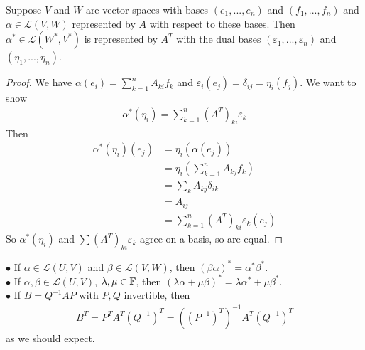 \documentclass[a4paper]{article}
\begin{document}
\begin{prop}
Suppose $V$ and $W$ are vector spaces with bases $\left(e_1,...,e_n\right)$ and $\left(f_1,...,f_n\right)$ and $\alpha \in \mathcal{L}\left(V,W\right)$ represented by $A$ with respect to these bases. Then $\alpha^* \in \mathcal{L} \left(W^*,V^*\right)$ is represented by $A^T$ with the dual bases $\left(\varepsilon_1,...,\varepsilon_n\right)$ and $\left(\eta_1,...,\eta_n\right)$.
\begin{proof}
We have $\alpha\left(e_i\right) = \sum_{k=1}^n A_{ki} f_k$ and $\varepsilon_i\left(e_j\right) = \delta_{ij} = \eta_i \left(f_j\right)$. We want to show
\begin{equation*}
\begin{aligned}
\alpha^*\left(\eta_i\right) = \sum_{k=1}^n \left(A^T\right)_{ki} \varepsilon_k
\end{aligned}
\end{equation*}
Then
\begin{equation*}
\begin{aligned}
\alpha^*\left(\eta_i\right)\left(e_j\right) &= \eta_i \left(\alpha\left(e_j\right)\right)\\
&= \eta_i\left(\sum_{k=1}^n A_{kj} f_k\right)\\
&= \sum_k A_{kj} \delta_{ik}\\
&= A_{ij}\\
&= \sum_{k=1}^n \left(A^T\right)_{ki} \varepsilon_k\left(e_j\right)
\end{aligned}
\end{equation*}
So $\alpha^*\left(\eta_i\right)$ and $\sum\left(A^T\right)_{ki}\varepsilon_k$ agree on a basis, so are equal.
\end{proof}
\end{prop}

\begin{rem}
$\bullet$ If $\alpha \in \mathcal{L}\left(U,V\right)$ and $\beta \in \mathcal{L}\left(V,W\right)$, then $\left(\beta\alpha\right)^* = \alpha^* \beta^*$.\\
$\bullet$ If $\alpha,\beta \in \mathcal{L}\left(U,V\right)$, $\lambda,\mu \in \mathbb{F}$, then $\left(\lambda \alpha+ \mu \beta\right)^* = \lambda \alpha^* + \mu \beta^*$.\\
$\bullet$ If $B=Q^{-1} AP$ with $P,Q$ invertible, then
\begin{equation*}
\begin{aligned}
B^T = P^T A^T \left(Q^{-1}\right)^T = \left(\left(P^{-1}\right)^T\right)^{-1} A^T \left(Q^{-1}\right)^T
\end{aligned}
\end{equation*}
as we should expect.
\end{rem}
\end{document}

